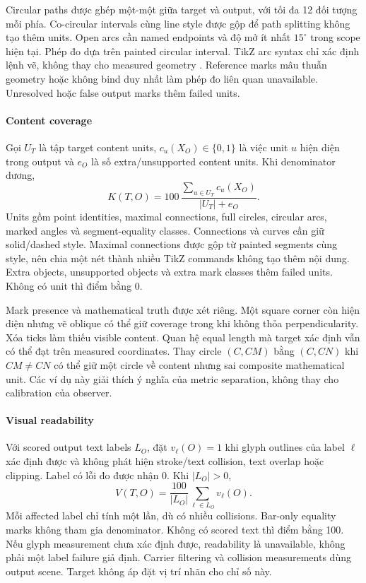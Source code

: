 \documentclass[a4paper,12pt]{article}
\begin{document}
Circular paths được ghép một-một giữa target và output, với tối đa 12 đối tượng mỗi phía. Co-circular intervals cùng line style được gộp để path splitting không tạo thêm units. Open arcs cần named endpoints và độ mở ít nhất $15^\circ$ trong scope hiện tại. Phép đo dựa trên painted circular interval. TikZ arc syntax chỉ xác định lệnh vẽ, không thay cho measured geometry \cite{tikzpaths}. Reference marks mâu thuẫn geometry hoặc không bind duy nhất làm phép đo liên quan unavailable. Unresolved hoặc false output marks thêm failed units.

\paragraph{Content coverage}
Gọi $U_T$ là tập target content units, $c_u(X_O)\in\{0,1\}$ là việc unit $u$ hiện diện trong output và $e_O$ là số extra/unsupported content units. Khi denominator dương,
\begin{equation}
K(T,O)=100\,
\frac{\sum_{u\in U_T}c_u(X_O)}{|U_T|+e_O}.
\end{equation}
Units gồm point identities, maximal connections, full circles, circular arcs, marked angles và segment-equality classes. Connections và curves cần giữ solid/dashed style. Maximal connections được gộp từ painted segments cùng style, nên chia một nét thành nhiều TikZ commands không tạo thêm nội dung. Extra objects, unsupported objects và extra mark classes thêm failed units. Không có unit thì điểm bằng 0.

Mark presence và mathematical truth được xét riêng. Một square corner còn hiện diện nhưng vẽ oblique có thể giữ coverage trong khi không thỏa perpendicularity. Xóa ticks làm thiếu visible content. Quan hệ equal length mà target xác định vẫn có thể đạt trên measured coordinates. Thay circle $(C,CM)$ bằng $(C,CN)$ khi $CM\ne CN$ có thể giữ một circle về content nhưng sai composite mathematical unit. Các ví dụ này giải thích ý nghĩa của metric separation, không thay cho calibration của observer.

\paragraph{Visual readability}
Với scored output text labels $L_O$, đặt $v_\ell(O)=1$ khi glyph outlines của label $\ell$ xác định được và không phát hiện stroke/text collision, text overlap hoặc clipping. Label có lỗi đo được nhận 0. Khi $|L_O|>0$,
\begin{equation}
V(T,O)=\frac{100}{|L_O|}\sum_{\ell\in L_O}v_\ell(O).
\end{equation}
Mỗi affected label chỉ tính một lần, dù có nhiều collisions. Bar-only equality marks không tham gia denominator. Không có scored text thì điểm bằng 100. Nếu glyph measurement chưa xác định được, readability là unavailable, không phải một label failure giả định. Carrier filtering và collision measurements dùng output scene. Target không áp đặt vị trí nhãn cho chỉ số này.
\end{document}
